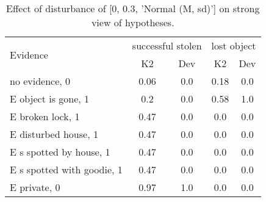 \begin{table}\begin{tabular}{l|cc|cc}\toprule\multirow{2}{*}{Evidence} & \multicolumn{2}{c}{successful stolen}& \multicolumn{2}{c}{lost object}\\& {K2} & {Dev}& {K2} & {Dev}\\\midrule
no evidence, 0 & \cellcolor{Bittersweet}0.06&\cellcolor{Bittersweet}0.0&\cellcolor{Bittersweet}0.18&\cellcolor{Bittersweet}0.0\\E object is gone, 1 & \cellcolor{Bittersweet}0.2&\cellcolor{Bittersweet}0.0&0.58&1.0\\E broken lock, 1 & 0.47&0.0&\cellcolor{Bittersweet}0.0&\cellcolor{Bittersweet}0.0\\E disturbed house, 1 & 0.47&0.0&\cellcolor{Bittersweet}0.0&\cellcolor{Bittersweet}0.0\\E s spotted by house, 1 & 0.47&0.0&\cellcolor{Bittersweet}0.0&\cellcolor{Bittersweet}0.0\\E s spotted with goodie, 1 & 0.47&0.0&\cellcolor{Bittersweet}0.0&\cellcolor{Bittersweet}0.0\\E private, 0 & \cellcolor{Bittersweet}0.97&\cellcolor{Bittersweet}1.0&\cellcolor{Bittersweet}0.0&\cellcolor{Bittersweet}0.0\\\bottomrule\end{tabular}\caption{Effect of disturbance of [0, 0.3, 'Normal (M, sd)'] on strong view of hypotheses.}\end{table}